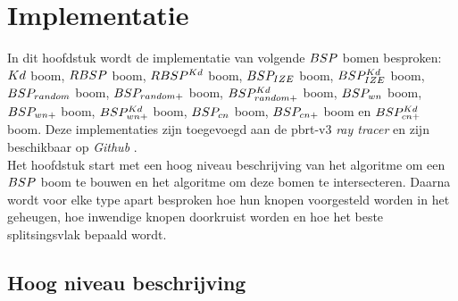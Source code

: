 \chapter{Implementatie}
\label{hoofdstuk:implementatie}
In dit hoofdstuk wordt de implementatie van volgende $BSP$ bomen besproken: $Kd$ boom, $RBSP$ boom, $RBSP^{Kd}$ boom, $BSP_{IZE}$ boom, $BSP^{Kd}_{IZE}$ boom, $BSP_{random}$ boom, $BSP_{random+}$ boom, $BSP^{Kd}_{random+}$ boom, $BSP_{wn}$ boom, $BSP_{wn+}$ boom, $BSP^{Kd}_{wn+}$ boom, $BSP_{cn}$ boom, $BSP_{cn+}$ boom en $BSP^{Kd}_{cn+}$ boom.
Deze implementaties zijn toegevoegd aan de pbrt-v3 \textit{ray tracer} \cite{pbrt} en zijn beschikbaar op \textit{Github} \cite{gh}.\\

Het hoofdstuk start met een hoog niveau beschrijving van het algoritme om een $BSP$ boom te bouwen en het algoritme om deze bomen te intersecteren.
Daarna wordt voor elke type apart besproken hoe hun knopen voorgesteld worden in het geheugen, hoe inwendige knopen doorkruist worden en hoe het beste splitsingsvlak bepaald wordt.

\lstset{style=pseudoStyle}

\section{Hoog niveau beschrijving}
\label{sec:h4-hoog-niveau}
